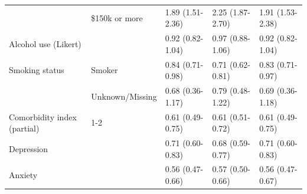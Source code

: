 \documentclass[11pt]{article}
\begin{document}
\begin{longtable}{@{}p{3.4cm}p{2.6cm}p{2.3cm}p{2.3cm}p{2.3cm}@{}}
 & \$150k or more & 1.89 (1.51-2.36) & 2.25 (1.87-2.70) & 1.91 (1.53-2.38) \\
Alcohol use (Likert) &  & 0.92 (0.82-1.04) & 0.97 (0.88-1.06) & 0.92 (0.82-1.04) \\
Smoking status & Smoker & 0.84 (0.71-0.98) & 0.71 (0.62-0.81) & 0.83 (0.71-0.97) \\
 & Unknown/Missing & 0.68 (0.36-1.17) & 0.79 (0.48-1.22) & 0.69 (0.36-1.18) \\
Comorbidity index (partial) & 1-2 & 0.61 (0.49-0.75) & 0.61 (0.51-0.72) & 0.61 (0.49-0.75) \\
Depression &  & 0.71 (0.60-0.83) & 0.68 (0.59-0.77) & 0.71 (0.60-0.83) \\
Anxiety &  & 0.56 (0.47-0.66) & 0.57 (0.50-0.66) & 0.56 (0.47-0.67) \\
\bottomrule \end{longtable}\normalsize
\end{document}
